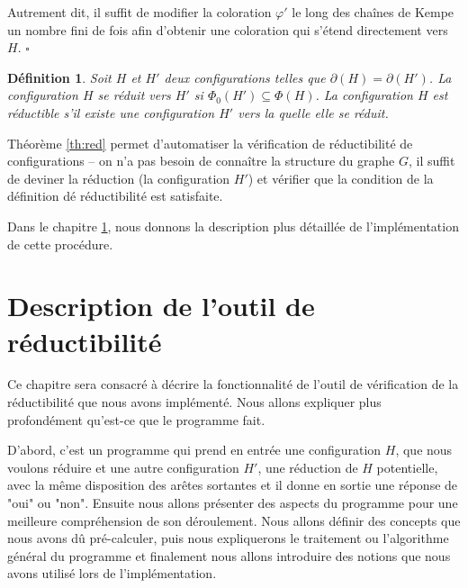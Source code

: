 \documentclass[10pt,a4paper]{article}
\newtheorem{definition}{Définition}
\newcommand{\ep}{{\hfill $\square$}}
\begin{document}
Autrement dit, il suffit de modifier la coloration $\varphi'$ le long des chaînes de Kempe un nombre fini de fois afin d'obtenir une coloration qui s'étend directement vers $H$. \ep

\begin{definition}
Soit $H$ et $H'$ deux configurations telles que $\partial(H)=\partial(H')$. La configuration $H$ \emph{se réduit} vers $H'$ si $\Phi_0(H')\subseteq \Phi(H)$. La configuration $H$ est \emph{réductible} s'il existe une configuration $H'$ vers la quelle elle se réduit.
\end{definition}

Théorème \ref{th:red} permet d'automatiser la vérification de réductibilité de configurations -- on n'a pas besoin de connaître la structure du graphe $G$, il suffit de deviner la réduction (la configuration $H'$) et vérifier que la condition de la définition dé réductibilité est satisfaite.

Dans le chapitre \ref{chap:Des}, nous donnons la description plus détaillée de l'implémentation de cette procédure.%

\section{Description de l'outil de réductibilité}
\label{chap:Des}

Ce chapitre sera consacré à décrire la fonctionnalité de l'outil de vérification de la réductibilité que nous avons implémenté. Nous allons expliquer plus profondément qu'est-ce que le programme fait.

D'abord, c'est un programme qui prend en entrée une configuration $H$, que nous voulons réduire et une autre configuration $H'$, une réduction de $H$ potentielle, avec la même disposition des arêtes sortantes et il donne en sortie une réponse de "oui" ou "non". Ensuite nous allons présenter des aspects du programme pour une meilleure compréhension de son déroulement. Nous allons définir des concepts que nous avons dû pré-calculer, puis nous expliquerons le traitement ou l'algorithme général du programme et finalement nous allons introduire des notions que nous avons utilisé lors de l'implémentation.
\end{document}
